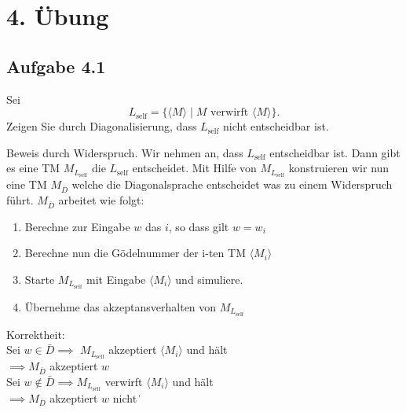 \section*{4. Übung}
\subsection*{Aufgabe 4.1}
Sei $$L_\text{self} = \{\langle M \rangle \mid M \text{ verwirft } \langle M \rangle \}.$$
Zeigen Sie durch Diagonalisierung, dass $L_\text{self}$ nicht entscheidbar ist.\

Beweis durch Widerspruch. Wir nehmen an, dass $L_\text{self}$
entscheidbar ist. Dann gibt es eine TM $M_{L_{\text{self}}}$ die
$L_\text{self}$ entscheidet. Mit Hilfe von $M_{L_{\text{self}}}$
konstruieren wir nun eine TM $M_{\bar{D}}$ welche die
Diagonalsprache entscheidet was zu einem Widerspruch führt. 
$M_{\bar{D}}$ arbeitet wie folgt:

\begin{enumerate}
	\item Berechne zur Eingabe $w$ das $i$, so dass gilt $w = w_i$
	\item Berechne nun die Gödelnummer der i-ten TM 
	$\langle M_i \rangle$
	\item Starte $M_{L_{\text{self}}}$ mit Eingabe 
	$\langle M_i \rangle$ und simuliere.
	\item Übernehme das akzeptansverhalten von $M_{L_{\text{self}}}$
\end{enumerate}

Korrektheit:\\

Sei $w \in \bar{D} \implies$ $M_{L_{\text{self}}}$ akzeptiert
$\langle M_i \rangle$ und hält\\
$\implies M_{\bar{D}}$ akzeptiert $w$\\

Sei $w \not\in \bar{D} \implies M_{L_{\text{self}}}$ verwirft
$\langle M_i \rangle$ und hält\\
$\implies M_{\bar{D}}$ akzeptiert $w$ nicht\.\

